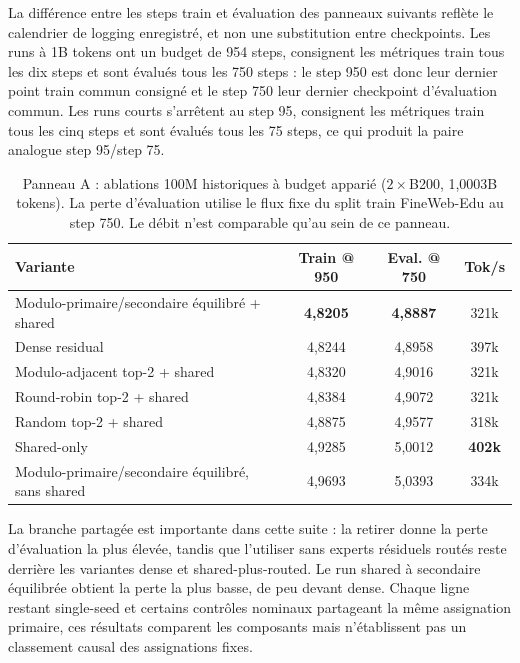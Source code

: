 \documentclass[10pt]{article}
\theoremstyle{definition}
\theoremstyle{remark}
\begin{document}
La diff\'{e}rence entre les steps train et \'{e}valuation des panneaux suivants refl\`{e}te le calendrier de logging enregistr\'{e}, et non une substitution entre checkpoints. Les runs \`{a} 1B tokens ont un budget de 954 steps, consignent les m\'{e}triques train tous les dix steps et sont \'{e}valu\'{e}s tous les 750 steps : le step 950 est donc leur dernier point train commun consign\'{e} et le step 750 leur dernier checkpoint d'\'{e}valuation commun. Les runs courts s'arr\^{e}tent au step 95, consignent les m\'{e}triques train tous les cinq steps et sont \'{e}valu\'{e}s tous les 75 steps, ce qui produit la paire analogue step 95/step 75.

\begin{table}[H]
\centering
\small
\caption{Panneau A : ablations 100M historiques \`{a} budget appari\'{e} ($2\times$B200, 1,0003B tokens). La perte d'\'{e}valuation utilise le flux fixe du split train FineWeb-Edu au step 750. Le d\'{e}bit n'est comparable qu'au sein de ce panneau.}
\label{tab:100m_ablation}
\begin{tabular}{lccc}
\toprule
\textbf{Variante} & \textbf{Train @ 950} & \textbf{Eval. @ 750} & \textbf{Tok/s} \\
\midrule
Modulo-primaire/secondaire \'{e}quilibr\'{e} + shared & \textbf{4,8205} & \textbf{4,8887} & 321k \\
Dense residual & 4,8244 & 4,8958 & 397k \\
Modulo-adjacent top-2 + shared & 4,8320 & 4,9016 & 321k \\
Round-robin top-2 + shared & 4,8384 & 4,9072 & 321k \\
Random top-2 + shared & 4,8875 & 4,9577 & 318k \\
Shared-only & 4,9285 & 5,0012 & \textbf{402k} \\
Modulo-primaire/secondaire \'{e}quilibr\'{e}, sans shared & 4,9693 & 5,0393 & 334k \\
\bottomrule
\end{tabular}
\end{table}

La branche partag\'{e}e est importante dans cette suite : la retirer donne la perte d'\'{e}valuation la plus \'{e}lev\'{e}e, tandis que l'utiliser sans experts r\'{e}siduels rout\'{e}s reste derri\`{e}re les variantes dense et shared-plus-routed. Le run shared \`{a} secondaire \'{e}quilibr\'{e}e obtient la perte la plus basse, de peu devant dense. Chaque ligne restant single-seed et certains contr\^{o}les nominaux partageant la m\^{e}me assignation primaire, ces r\'{e}sultats comparent les composants mais n'\'{e}tablissent pas un classement causal des assignations fixes.
\end{document}
